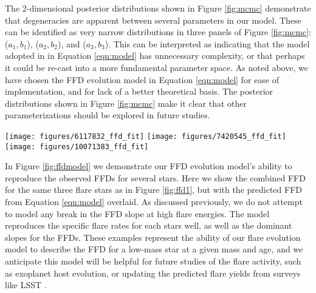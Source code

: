 \documentclass[preprint2]{aastex62}
\begin{document}
The 2-dimensional posterior distributions shown in Figure \ref{fig:mcmc} demonstrate that degeneracies are apparent between several parameters in our model. These can be identified as very narrow distributions in three panels of Figure \ref{fig:mcmc}: ($a_1, b_1$), ($a_2, b_2$), and ($a_3, b_3$). This can be interpreted as indicating that the model adopted in in Equation \ref{eqn:model} has unnecessary complexity, or that perhaps it could be re-cast into a more fundamental parameter space. As noted above, we have chosen the FFD evolution model in Equation \ref{eqn:model} for ease of implementation, and for lack of a better theoretical basis. The posterior distributions shown in Figure \ref{fig:mcmc} make it clear that other parameterizations should be explored in future studies.


\begin{figure*}[!t]
\centering
\texttt{[image: figures/6117832\_ffd\_fit]}
\texttt{[image: figures/7420545\_ffd\_fit]}
\texttt{[image: figures/10071383\_ffd\_fit]}
\caption{
Flare frequency distributions as shown from Figure \ref{fig:ffd1} (black line), but with the final flare activity model from Equation \ref{eqn:model} evaluated for each star's mass and age (red line). Note this model was not fit for each star's FFD individually, but instead was fit to our entire sample of 347 stars.}
\label{fig:ffdmodel}
\end{figure*}



In Figure \ref{fig:ffdmodel} we demonstrate our FFD evolution model's ability to reproduce the observed FFDs for several stars. Here we show the combined FFD for the same three flare stars as in Figure \ref{fig:ffd1}, but with the predicted FFD from Equation \ref{eqn:model} overlaid. As discussed previously, we do not attempt to model any break in the FFD slope at high flare energies. The model reproduces the specific flare rates for each stars well, as well as the dominant slopes for the FFDs. These examples represent the ability of our flare evolution model to describe the FFD for a low-mass star at a given mass and age, and we anticipate this model will be helpful for future studies of the flare activity, such as exoplanet host evolution, or updating the predicted flare yields from surveys like LSST \citep{najita2016}.
\end{document}
